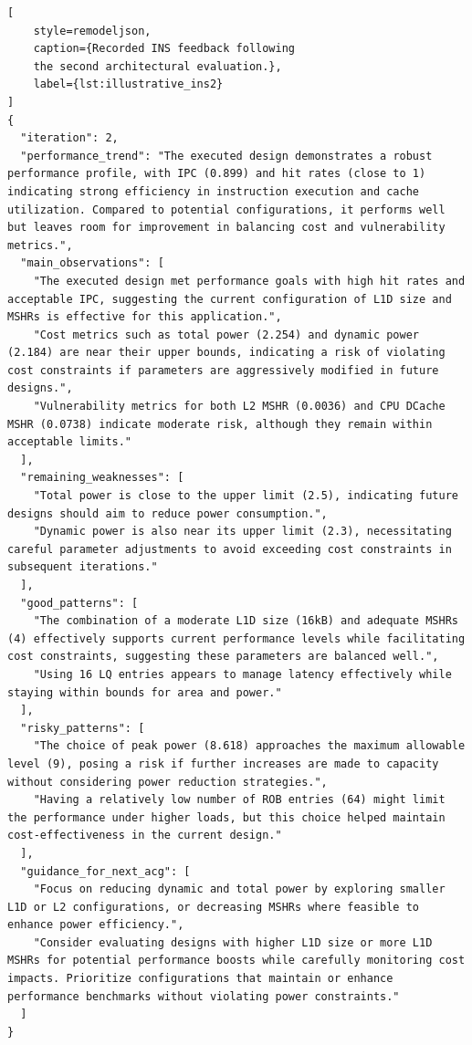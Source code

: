 \begin{lstlisting}[
    style=remodeljson,
    caption={Recorded INS feedback following
    the second architectural evaluation.},
    label={lst:illustrative_ins2}
]
{
  "iteration": 2,
  "performance_trend": "The executed design demonstrates a robust performance profile, with IPC (0.899) and hit rates (close to 1) indicating strong efficiency in instruction execution and cache utilization. Compared to potential configurations, it performs well but leaves room for improvement in balancing cost and vulnerability metrics.",
  "main_observations": [
    "The executed design met performance goals with high hit rates and acceptable IPC, suggesting the current configuration of L1D size and MSHRs is effective for this application.",
    "Cost metrics such as total power (2.254) and dynamic power (2.184) are near their upper bounds, indicating a risk of violating cost constraints if parameters are aggressively modified in future designs.",
    "Vulnerability metrics for both L2 MSHR (0.0036) and CPU DCache MSHR (0.0738) indicate moderate risk, although they remain within acceptable limits."
  ],
  "remaining_weaknesses": [
    "Total power is close to the upper limit (2.5), indicating future designs should aim to reduce power consumption.",
    "Dynamic power is also near its upper limit (2.3), necessitating careful parameter adjustments to avoid exceeding cost constraints in subsequent iterations."
  ],
  "good_patterns": [
    "The combination of a moderate L1D size (16kB) and adequate MSHRs (4) effectively supports current performance levels while facilitating cost constraints, suggesting these parameters are balanced well.",
    "Using 16 LQ entries appears to manage latency effectively while staying within bounds for area and power."
  ],
  "risky_patterns": [
    "The choice of peak power (8.618) approaches the maximum allowable level (9), posing a risk if further increases are made to capacity without considering power reduction strategies.",
    "Having a relatively low number of ROB entries (64) might limit the performance under higher loads, but this choice helped maintain cost-effectiveness in the current design."
  ],
  "guidance_for_next_acg": [
    "Focus on reducing dynamic and total power by exploring smaller L1D or L2 configurations, or decreasing MSHRs where feasible to enhance power efficiency.",
    "Consider evaluating designs with higher L1D size or more L1D MSHRs for potential performance boosts while carefully monitoring cost impacts. Prioritize configurations that maintain or enhance performance benchmarks without violating power constraints."
  ]
}
\end{lstlisting}

